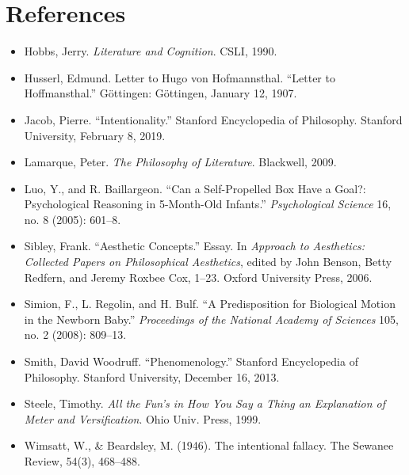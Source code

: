 \section*{References}
{
\small
\begin{itemize}[label={},itemindent=-2em,leftmargin=2em]	
\item Hobbs, Jerry. \emph{Literature and Cognition}. CSLI, 1990.

\item Husserl, Edmund. Letter to Hugo von Hofmannsthal. ``Letter to
Hoffmansthal.'' Göttingen: Göttingen, January 12, 1907.

\item Jacob, Pierre. ``Intentionality.'' Stanford Encyclopedia of Philosophy.
Stanford University, February 8, 2019.

\item Lamarque, Peter. \emph{The Philosophy of Literature}. Blackwell, 2009.

\item Luo, Y., and R. Baillargeon. ``Can a Self-Propelled Box Have a Goal?:
Psychological Reasoning in 5-Month-Old Infants.'' \emph{Psychological
Science} 16, no. 8 (2005): 601--8.

\item Sibley, Frank. ``Aesthetic Concepts.'' Essay. In \emph{Approach to
Aesthetics: Collected Papers on Philosophical Aesthetics}, edited by
John Benson, Betty Redfern, and Jeremy Roxbee Cox, 1--23. Oxford
University Press, 2006.

\item Simion, F., L. Regolin, and H. Bulf. ``A Predisposition for Biological
Motion in the Newborn Baby.'' \emph{Proceedings of the National Academy
of Sciences} 105, no. 2 (2008): 809--13.

\item Smith, David Woodruff. ``Phenomenology.'' Stanford Encyclopedia of
Philosophy. Stanford University, December 16, 2013.

\item Steele, Timothy. \emph{All the Fun's in How You Say a Thing an
Explanation of Meter and Versification}. Ohio Univ. Press, 1999.

\item Wimsatt, W., \& Beardsley, M. (1946). The intentional fallacy. The
Sewanee Review, 54(3), 468--488.
\end{itemize}
}

